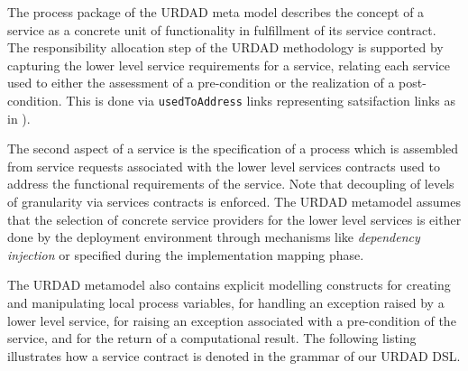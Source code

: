 The process package of the URDAD meta model describes the concept of a service as a concrete unit of functionality in fulfillment of its service contract. The responsibility allocation step of the URDAD methodology is supported by capturing the lower level service requirements for a service, relating each service used to either the assessment of a pre-condition or the realization of a post-condition. This is done via \verb+usedToAddress+ links representing satsifaction links as in  \cite{ramesh_toward_2001}). 

The second aspect of a service is the specification of a process which is assembled from service requests associated with the lower level services contracts used to address the functional requirements of the service. Note that decoupling of levels of granularity via services contracts is enforced. The URDAD metamodel assumes that the selection of concrete service providers for the lower level services is either done by the deployment environment through mechanisms like \emph{dependency injection} or specified during the implementation mapping phase.

The URDAD metamodel also contains explicit modelling constructs for creating and manipulating local process variables,  for handling an exception raised by a lower level service, for raising an exception associated with a pre-condition of the service, and for the return of a computational result. The following listing illustrates how a service contract is denoted in the grammar of our URDAD DSL.

